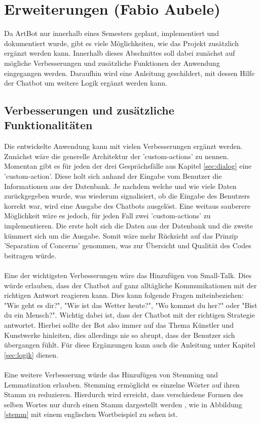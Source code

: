 \section{Erweiterungen (Fabio Aubele)}\label{sec:erweiterungen}
Da ArtBot nur innerhalb eines Semesters geplant, implementiert und dokumentiert wurde, gibt es viele Möglichkeiten, wie das Projekt zusätzlich ergänzt werden kann. Innerhalb dieses Abschnittes soll dabei zunächst auf mögliche Verbesserungen und zusätzliche Funktionen der Anwendung eingegangen werden. Daraufhin wird eine Anleitung geschildert, mit dessen Hilfe der Chatbot um weitere Logik ergänzt werden kann.

\subsection{Verbesserungen und zusätzliche Funktionalitäten}
Die entwickelte Anwendung kann mit vielen Verbesserungen ergänzt werden. Zunächst wäre die generelle Architektur der 'custom-actions' zu nennen. Momentan gibt es für jeden der drei Gesprächsfälle aus Kapitel \ref{sec:dialog} eine 'custom-action'. Diese holt sich anhand der Eingabe vom Benutzer die Informationen aus der Datenbank. Je nachdem welche und wie viele Daten zurückgegeben wurde, was wiederum signalisiert, ob die Eingabe des Benutzers korrekt war, wird eine Ausgabe des Chatbots ausgelöst. Eine weitaus sauberere Möglichkeit wäre es jedoch, für jeden Fall zwei 'custom-actions' zu implementieren. Die erste holt sich die Daten aus der Datenbank und die zweite kümmert sich um die Ausgabe. Somit wäre mehr Rücksicht auf das Prinzip 'Separation of Concerns' genommen, was zur Übersicht und Qualität des Codes beitragen würde.\\
\\
Eine der wichtigsten Verbesserungen wäre das Hinzufügen von Small-Talk. Dies würde erlauben, dass der Chatbot auf ganz alltägliche Kommunikationen mit der richtigen Antwort reagieren kann. Dies kann folgende Fragen miteinbeziehen: "Wie geht es dir?", "Wie ist das Wetter heute?", "Wo kommst du her?" oder "Bist du ein Mensch?". Wichtig dabei ist, dass der Chatbot mit der richtigen Strategie antwortet. Hierbei sollte der Bot also immer auf das Thema Künstler und Kunstwerke hinleiten, dies allerdings nie so abrupt, dass der Benutzer sich übergangen fühlt. Für diese Ergänzungen kann auch die Anleitung unter Kapitel \ref{sec:logik} dienen.\\
\\
Eine weitere Verbesserung würde das Hinzufügen von Stemming und Lemmatization erlauben. Stemming ermöglicht es einzelne Wörter auf ihren Stamm zu reduzieren. Hierdurch wird erreicht, dass verschiedene Formen des selben Wortes nur durch einen Stamm dargestellt werden \cite{stemming}, wie in Abbildung \ref{stemm} mit einem englischen Wortbeispiel zu sehen ist.
